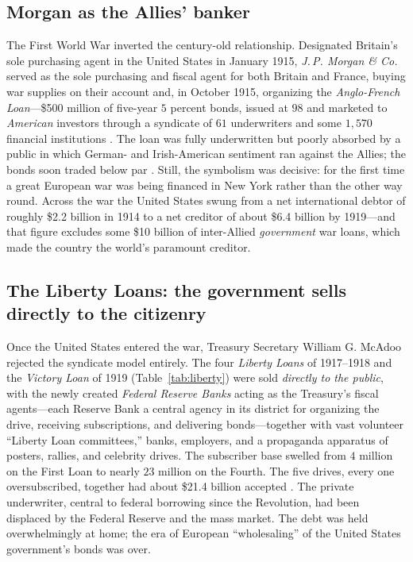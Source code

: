 \documentclass[12pt]{article}
\begin{document}
\subsection{Morgan as the Allies' banker}

The First World War inverted the century-old relationship. Designated Britain's
sole purchasing agent in the United States in January 1915, \emph{J.\,P. Morgan
\& Co.} served as the sole purchasing and fiscal agent for both Britain and
France, buying war supplies on their account \citep[187--192]{chernow1990house}
and, in October 1915, organizing the \emph{Anglo-French Loan}---\$500 million of
five-year $5$ percent bonds, issued at $98$ and marketed to \emph{American}
investors through a syndicate of $61$ underwriters and some $1{,}570$ financial
institutions \citep[198--202]{chernow1990house}. The loan was fully underwritten
but poorly absorbed by a public in which German- and Irish-American sentiment ran
against the Allies; the bonds soon traded below par \citep{burk1985sinews}. Still, the
symbolism was decisive: for the first time a great European war was being financed
in New York rather than the other way round. Across the war the United States
swung from a net international debtor of roughly \$2.2 billion in 1914 to a net
creditor of about \$6.4 billion by 1919---and that figure excludes some \$10
billion of inter-Allied \emph{government} war loans, which made the country the
world's paramount creditor.

\subsection{The Liberty Loans: the government sells directly to the citizenry}

Once the United States entered the war, Treasury Secretary William G. McAdoo
rejected the syndicate model entirely. The four \emph{Liberty Loans} of
1917--1918 and the \emph{Victory Loan} of 1919 (Table~\ref{tab:liberty}) were
sold \emph{directly to the public}, with the newly created \emph{Federal Reserve
Banks} acting as the Treasury's fiscal agents---each Reserve Bank a central agency
in its district for organizing the drive, receiving subscriptions, and delivering
bonds---together with vast volunteer ``Liberty Loan committees,'' banks,
employers, and a propaganda apparatus of posters, rallies, and celebrity drives.
The subscriber base swelled from $4$ million on the First Loan to nearly $23$
million on the Fourth. The five drives, every one oversubscribed, together had
about \$21.4 billion accepted \citep{gilbert1970american,
kangrockoff2015capitalizing, mcadoo1931crowded, fedhistory_libertybonds}. The
private underwriter, central to federal borrowing since the Revolution, had been
displaced by the Federal Reserve and the mass market. The debt was held
overwhelmingly at home; the era of European ``wholesaling'' of the United States
government's bonds was over.
\end{document}
